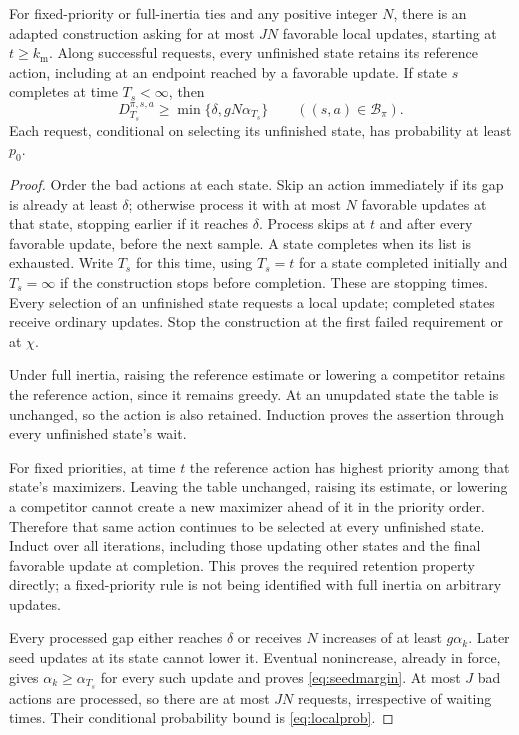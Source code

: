 \begin{lemma}\label{lem:seeds}
For fixed-priority or full-inertia\linebreak
ties and any positive integer $N$, there is an adapted construction asking for at most $JN$
favorable local updates, starting at $t\ge k_{\mathrm m}$. Along successful requests, every unfinished state
retains its reference action, including at an endpoint reached by a favorable update. If state $s$
completes at time $T_s<\infty$, then
\begin{equation}\label{eq:seedmargin}
D_{T_s}^{\pi,s,a}\ge\min\{\delta,gN\alpha_{T_s}\}\qquad((s,a)\in\mathcal B_\pi).
\end{equation}
Each request, conditional on selecting its unfinished state, has probability at least $p_0$.
\end{lemma}
\begin{proof}
Order the bad actions at each state. Skip an action immediately if its gap is already
at least $\delta$; otherwise process it with at most $N$ favorable updates at that state, stopping
earlier if it reaches $\delta$. Process skips at $t$ and after every favorable update, before the next
sample. A state completes when its list is exhausted. Write $T_s$ for this time, using $T_s=t$ for
a state completed initially and $T_s=\infty$ if the construction stops before completion. These
are stopping times. Every selection of an unfinished state requests a local update; completed
states receive ordinary updates. Stop the construction at the first failed requirement or at $\chi$.

Under full inertia, raising the reference estimate or lowering a competitor retains the
reference action, since it remains greedy. At an unupdated state the table is unchanged, so
the action is also retained. Induction proves the assertion through every unfinished state's
wait.

For fixed priorities, at time $t$ the reference action has highest priority among that state's
maximizers. Leaving the table unchanged, raising its estimate, or lowering a competitor
cannot create a new maximizer ahead of it in the priority order. Therefore that same action
continues to be selected at every unfinished state. Induct over all iterations, including those
updating other states and the final favorable update at completion. This proves the required
retention property directly; a fixed-priority rule is not being identified with full inertia on
arbitrary updates.

Every processed gap either reaches $\delta$ or receives $N$ increases of at least $g\alpha_k$. Later seed
updates at its state cannot lower it. Eventual nonincrease, already in force, gives $\alpha_k\ge\alpha_{T_s}$
for every such update and proves \eqref{eq:seedmargin}. At most $J$ bad actions are processed, so there are
at most $JN$ requests, irrespective of waiting times. Their conditional probability bound is
\eqref{eq:localprob}.
\end{proof}

